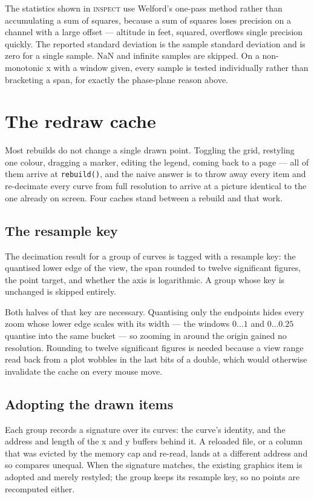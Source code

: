 \documentclass[11pt,a4paper,oneside]{report}
\newcommand{\code}[1]{\texttt{#1}}
\newcommand{\tab}[1]{\textsc{#1}}
\begin{document}
The statistics shown in \tab{inspect} use Welford's one-pass method rather than
accumulating a sum of squares, because a sum of squares loses precision on a
channel with a large offset --- altitude in feet, squared, overflows single
precision quickly. The reported standard deviation is the sample standard
deviation and is zero for a single sample. NaN and infinite samples are skipped.
On a non-monotonic x with a window given, every sample is tested individually
rather than bracketing a span, for exactly the phase-plane reason above.

\section{The redraw cache}
\label{sec:redrawcache}

Most rebuilds do not change a single drawn point. Toggling the grid, restyling
one colour, dragging a marker, editing the legend, coming back to a page --- all
of them arrive at \code{rebuild()}, and the naive answer is to throw away every
item and re-decimate every curve from full resolution to arrive at a picture
identical to the one already on screen. Four caches stand between a rebuild and
that work.

\subsection{The resample key}

The decimation result for a group of curves is tagged with a resample key: the
quantised lower edge of the view, the span rounded to twelve significant
figures, the point target, and whether the axis is logarithmic. A group whose
key is unchanged is skipped entirely.

Both halves of that key are necessary. Quantising only the endpoints hides every
zoom whose lower edge scales with its width --- the windows $0 \ldots 1$ and
$0 \ldots 0.25$ quantise into the same bucket --- so zooming in around the
origin gained no resolution. Rounding to twelve significant figures is needed
because a view range read back from a plot wobbles in the last bits of a double,
which would otherwise invalidate the cache on every mouse move.

\subsection{Adopting the drawn items}

Each group records a signature over its curves: the curve's identity, and the
address and length of the x and y buffers behind it. A reloaded file, or a
column that was evicted by the memory cap and re-read, lands at a different
address and so compares unequal. When the signature matches, the existing
graphics item is adopted and merely restyled; the group keeps its resample key,
so no points are recomputed either.
\end{document}
